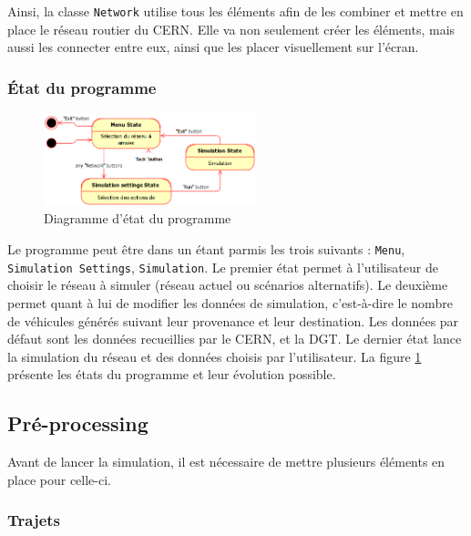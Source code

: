 \documentclass[a4paper,11pt, titlepage]{extarticle}
\begin{document}
Ainsi, la classe \texttt{Network} utilise tous les éléments afin de les combiner et mettre en place le réseau routier du CERN. Elle va non seulement créer les éléments, mais aussi les connecter entre eux, ainsi que les placer visuellement sur l'écran.

\newpage

\subsubsection{\label{sctEtats}État du programme}

\begin{figure}
  \begin{center}
    \includegraphics[width=0.55\textwidth]{states_diagram.png}
  \end{center}
  \caption{Diagramme d'état du programme}
  \label{imgStates}
\end{figure}

Le programme peut être dans un étant parmis les trois suivants : \texttt{Menu}, \texttt{Simulation Settings}, \texttt{Simulation}. Le premier état permet à l'utilisateur de choisir le réseau à simuler (réseau actuel ou scénarios alternatifs). Le deuxième permet quant à lui de modifier les données de simulation, c'est-à-dire le nombre de véhicules générés suivant leur provenance et leur destination. Les données par défaut sont les données recueillies par le CERN, et la DGT. Le dernier état lance la simulation du réseau et des données choisis par l'utilisateur. La figure \ref{imgStates} présente les états du programme et leur évolution possible.

\subsection{Pré-processing}

Avant de lancer la simulation, il est nécessaire de mettre plusieurs éléments en place pour celle-ci.

\subsubsection{Trajets}
\end{document}
